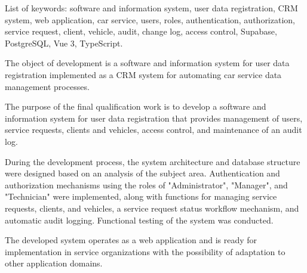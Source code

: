 List of keywords: software and information system, user data registration, CRM system, web application, car service, users, roles, authentication, authorization, service request, client, vehicle, audit, change log, access control, Supabase, PostgreSQL, Vue 3, TypeScript.

The object of development is a software and information system for user data registration implemented as a CRM system for automating car service data management processes.

The purpose of the final qualification work is to develop a software and information system for user data registration that provides management of users, service requests, clients and vehicles, access control, and maintenance of an audit log.

During the development process, the system architecture and database structure were designed based on an analysis of the subject area. Authentication and authorization mechanisms using the roles of "Administrator", "Manager", and "Technician" were implemented, along with functions for managing service requests, clients, and vehicles, a service request status workflow mechanism, and automatic audit logging. Functional testing of the system was conducted.

The developed system operates as a web application and is ready for implementation in service organizations with the possibility of adaptation to other application domains.
